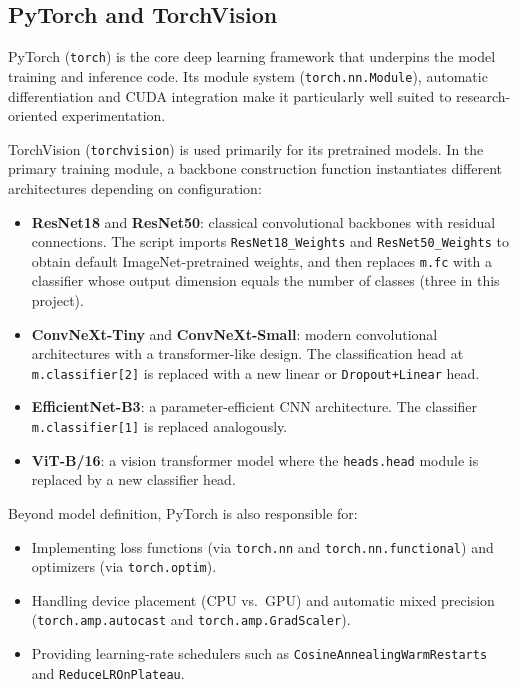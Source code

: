\subsection{PyTorch and TorchVision}

PyTorch (\texttt{torch}) is the core deep learning framework that underpins the model training and inference code. Its module system (\texttt{torch.nn.Module}), automatic differentiation and CUDA integration make it particularly well suited to research-oriented experimentation.

TorchVision (\texttt{torchvision}) is used primarily for its pretrained models. In the primary training module, a backbone construction function instantiates different architectures depending on configuration:
\begin{itemize}
  \item \textbf{ResNet18} and \textbf{ResNet50}: classical convolutional backbones with residual connections. The script imports \texttt{ResNet18\_Weights} and \texttt{ResNet50\_Weights} to obtain default ImageNet-pretrained weights, and then replaces \texttt{m.fc} with a classifier whose output dimension equals the number of classes (three in this project).
  \item \textbf{ConvNeXt-Tiny} and \textbf{ConvNeXt-Small}: modern convolutional architectures with a transformer-like design. The classification head at \texttt{m.classifier[2]} is replaced with a new linear or \texttt{Dropout+Linear} head.
  \item \textbf{EfficientNet-B3}: a parameter-efficient CNN architecture. The classifier \texttt{m.classifier[1]} is replaced analogously.
  \item \textbf{ViT-B/16}: a vision transformer model where the \texttt{heads.head} module is replaced by a new classifier head.
\end{itemize}

Beyond model definition, PyTorch is also responsible for:
\begin{itemize}
  \item Implementing loss functions (via \texttt{torch.nn} and \texttt{torch.nn.functional}) and optimizers (via \texttt{torch.optim}).
  \item Handling device placement (CPU vs.\ GPU) and automatic mixed precision (\texttt{torch.amp.autocast} and \texttt{torch.amp.GradScaler}).
  \item Providing learning-rate schedulers such as \texttt{CosineAnnealingWarmRestarts} and \texttt{ReduceLROnPlateau}.
\end{itemize}

